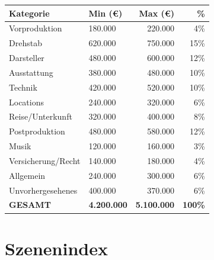 \documentclass[11pt,a4paper,twoside]{book}
\begin{document}
\begin{tabularx}{\textwidth}{Xlrr}
\toprule
\textbf{Kategorie} & \textbf{Min (€)} & \textbf{Max (€)} & \textbf{\%} \\
\midrule
Vorproduktion & 180.000 & 220.000 & 4\% \\
Drehstab & 620.000 & 750.000 & 15\% \\
Darsteller & 480.000 & 600.000 & 12\% \\
Ausstattung & 380.000 & 480.000 & 10\% \\
Technik & 420.000 & 520.000 & 10\% \\
Locations & 240.000 & 320.000 & 6\% \\
Reise/Unterkunft & 320.000 & 400.000 & 8\% \\
Postproduktion & 480.000 & 580.000 & 12\% \\
Musik & 120.000 & 160.000 & 3\% \\
Versicherung/Recht & 140.000 & 180.000 & 4\% \\
Allgemein & 240.000 & 300.000 & 6\% \\
Unvorhergesehenes & 400.000 & 370.000 & 6\% \\
\midrule
\textbf{GESAMT} & \textbf{4.200.000} & \textbf{5.100.000} & \textbf{100\%} \\
\bottomrule
\end{tabularx}

\chapter{Szenenindex}
\end{document}

